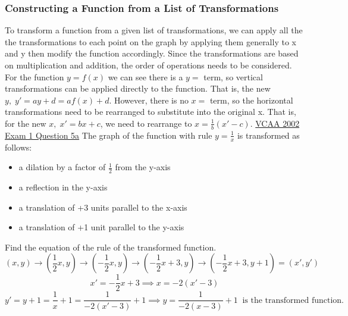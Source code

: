 \documentclass{article}
\begin{document}
			\subsubsection{Constructing a Function from a List of Transformations}
				To transform a function from a given list of transformations, we can apply all the the transformations to each point on the graph by applying them generally to x and y then modify the function accordingly.
				\newline\newline
				Since the transformations are based on multiplication and addition, the order of operations needs to be considered.
				\newline
				For the function $y=f(x)$ we can see there is a $y=$ term, so vertical transformations can be applied directly to the function. That is, the new $y,\;y'=ay+d=af(x)+d$.
				\newline
				However, there is no $x=$ term, so the horizontal transformations need to be rearranged to substitute into the original x. That is, for the new $x,\;x'=bx+c$, we need to rearrange to $x=\frac{1}{b}(x'-c)$.
				\newpage
				\noindent\underline{VCAA 2002 Exam 1 Question 5a}\newline
				The graph of the function with rule $y=\frac{1}{x}$ is transformed as follows:
				\begin{itemize}
					\item a dilation by a factor of $\frac{1}{2}$ from the y-axis
					\item a reflection in the y-axis
					\item a translation of +3 units parallel to the x-axis
					\item a translation of +1 unit parallel to the y-axis
				\end{itemize}
				Find the equation of the rule of the transformed function.
				\[(x,y)\to\left(\frac{1}{2}x,y\right)\to\left(-\frac{1}{2}x,y\right)\to\left(-\frac{1}{2}x+3,y\right)\to\left(-\frac{1}{2}x+3,y+1\right)=(x',y')\]
				\[x'=-\frac{1}{2}x+3\implies x=-2(x'-3)\]
				\[y'=y+1=\frac{1}{x}+1=\frac{1}{-2(x'-3)}+1\implies y=\frac{1}{-2(x-3)}+1\;\;\text{is the transformed function.}\]
\end{document}
